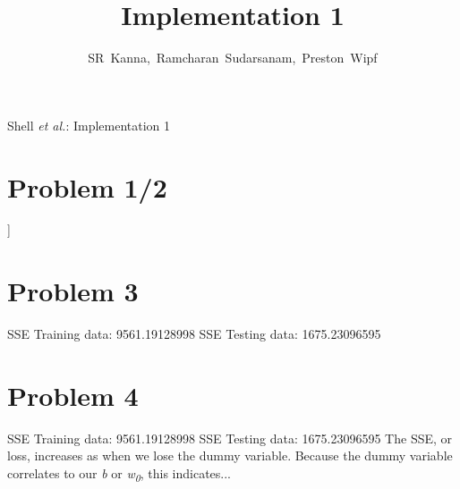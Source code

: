 \documentclass[journal]{IEEEtran}
\begin{document}
\onecolumn

\title{Implementation 1}
\author{SR~Kanna,~Ramcharan~Sudarsanam,~Preston~Wipf}%

%
{Shell \MakeLowercase{\textit{et al.}}: Implementation 1}

\maketitle
\bigskip



\section{Problem 1/2}
\noindent [[  3.95843212e+01] \newline
\noindent [ -1.01137046e-01] \newline
\noindent [  4.58935299e-02] \newline
\noindent [ -2.73038670e-03] \newline
\noindent [  3.07201340e+00] \newline
\noindent [ -1.72254072e+01] \newline
\noindent [  3.71125235e+00] \newline
\noindent [  7.15862492e-03] \newline
\noindent [ -1.59900210e+00] \newline
\noindent [  3.73623375e-01] \newline
\noindent [ -1.57564197e-02] \newline
\noindent [ -1.02417703e+00] \newline
\noindent [  9.69321451e-03] \newline
\noindent [ -5.85969273e-01]] \newline
\medskip

\section{Problem 3}
\noindent SSE Training data: 9561.19128998 \newline
\noindent SSE Testing data:  1675.23096595 \newline
\medskip

\section{Problem 4}
\noindent SSE Training data: 9561.19128998 \newline
\noindent SSE Testing data:  1675.23096595 \newline
\noindent The SSE, or loss, increases as when we lose the dummy variable.
Because the dummy variable correlates to our \textit{b} or \textit{w\textsubscript{0}},
this indicates...
\medskip
\end{document}

